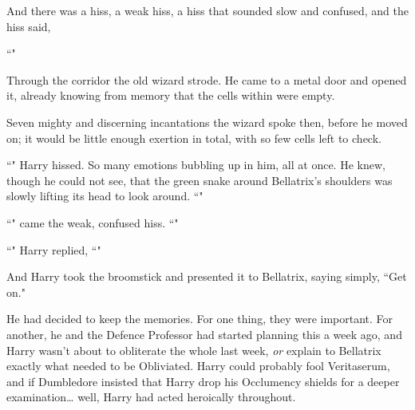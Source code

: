 And there was a hiss, a weak hiss, a hiss that sounded slow and confused, and the hiss said,

``"

\later

Through the corridor the old wizard strode. He came to a metal door and opened it, already knowing from memory that the cells within were empty.

Seven mighty and discerning incantations the wizard spoke then, before he moved on; it would be little enough exertion in total, with so few cells left to check.

\later

``" Harry hissed. So many emotions bubbling up in him, all at once. He knew, though he could not see, that the green snake around Bellatrix's shoulders was slowly lifting its head to look around. ``"

``" came the weak, confused hiss. ``"

``" Harry replied, ``"

And Harry took the broomstick and presented it to Bellatrix, saying simply, ``Get on."

He had decided to keep the memories. For one thing, they were important. For another, he and the Defence Professor had started planning this a week ago, and Harry wasn't about to obliterate the whole last week, \emph{or} explain to Bellatrix exactly what needed to be Obliviated. Harry could probably fool Veritaserum, and if Dumbledore insisted that Harry drop his Occlumency shields for a deeper examination{\ldots} well, Harry had acted heroically throughout.

